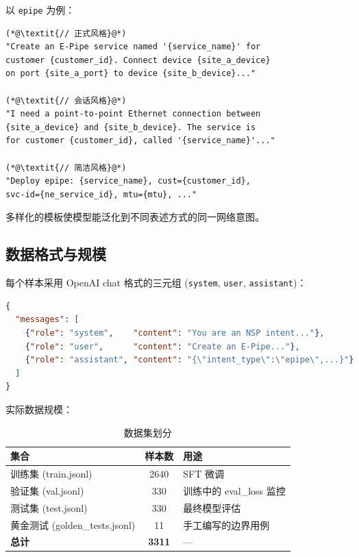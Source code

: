 \documentclass[12pt, a4paper]{article}
\newcommand{\intenttype}[1]{\texttt{#1}}
\begin{document}
\noindent
以 \intenttype{epipe} 为例：

\begin{lstlisting}[language={}, caption={epipe 指令模板示例（三种风格）}, numbers=none]
(*@\textit{// 正式风格}@*)
"Create an E-Pipe service named '{service_name}' for
customer {customer_id}. Connect device {site_a_device}
on port {site_a_port} to device {site_b_device}..."

(*@\textit{// 会话风格}@*)
"I need a point-to-point Ethernet connection between
{site_a_device} and {site_b_device}. The service is
for customer {customer_id}, called '{service_name}'..."

(*@\textit{// 简洁风格}@*)
"Deploy epipe: {service_name}, cust={customer_id},
svc-id={ne_service_id}, mtu={mtu}, ..."
\end{lstlisting}

\noindent
多样化的模板使模型能泛化到不同表述方式的同一网络意图。

\subsection{数据格式与规模}

每个样本采用 OpenAI chat 格式的三元组 (\texttt{system}, \texttt{user}, \texttt{assistant})：

\begin{lstlisting}[language=json, caption={训练样本格式示例}]
{
  "messages": [
    {"role": "system",    "content": "You are an NSP intent..."},
    {"role": "user",      "content": "Create an E-Pipe..."},
    {"role": "assistant", "content": "{\"intent_type\":\"epipe\",...}"}
  ]
}
\end{lstlisting}

\noindent
实际数据规模：

\begin{table}[H]
\centering
\caption{数据集划分}
\label{tab:data-split}
\small
\begin{tabular}{lcl}
\toprule
\textbf{集合} & \textbf{样本数} & \textbf{用途} \\
\midrule
训练集 (train.jsonl) & 2640 & SFT 微调 \\
验证集 (val.jsonl)   & 330  & 训练中的 eval\_loss 监控 \\
测试集 (test.jsonl)  & 330  & 最终模型评估 \\
黄金测试 (golden\_tests.jsonl) & 11 & 手工编写的边界用例 \\
\midrule
\textbf{总计} & \textbf{3311} & --- \\
\bottomrule
\end{tabular}
\end{table}
\end{document}
